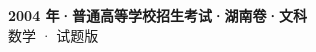 \documentclass[zihao=-4, a4paper]{ctexart}
\begin{document}
\begin{center}
  {\Large\bfseries 2004 年·普通高等学校招生考试·湖南卷·文科}\\[4pt]
  {\large 数学 · 试题版}
\end{center}
\medskip
{}

\end{document}
